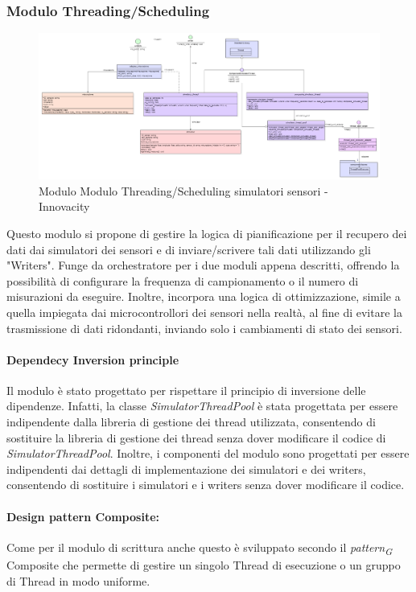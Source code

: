 \begin{itemize}
\subsubsection{Modulo Threading/Scheduling}
\begin{figure}[H]
    \centering
    \includegraphics[width=1.1\textwidth]{../Images/SpecificaTecnica/simulatorThread.PNG}
    \caption{Modulo Modulo Threading/Scheduling simulatori sensori - Innovacity}
    \label{fig: Modulo_simulatori_sensori_thread}
\end{figure}
Questo modulo si propone di gestire la logica di pianificazione per il recupero dei dati dai simulatori dei sensori e di inviare/scrivere tali dati utilizzando gli "Writers". Funge da orchestratore per i due moduli appena descritti, offrendo la possibilità di configurare la frequenza di campionamento o il numero di misurazioni da eseguire. Inoltre, incorpora una logica di ottimizzazione, simile a quella impiegata dai microcontrollori dei sensori nella realtà, al fine di evitare la trasmissione di dati ridondanti, inviando solo i cambiamenti di stato dei sensori.

\paragraph*{Dependecy Inversion principle}
Il modulo è stato progettato per rispettare il principio di inversione delle dipendenze. Infatti, la classe \textit{SimulatorThreadPool} è stata progettata per essere indipendente dalla libreria di gestione dei thread utilizzata, consentendo di sostituire la libreria di gestione dei thread senza dover modificare il codice di \textit{SimulatorThreadPool}.
Inoltre, i componenti del modulo sono progettati per essere indipendenti dai dettagli di implementazione dei simulatori e dei writers, consentendo di sostituire i simulatori e i writers senza dover modificare il codice.

\paragraph{Design pattern Composite:}
Come per il modulo di scrittura anche questo è sviluppato secondo il \textit{pattern}\textsubscript{\textit{G}} Composite che permette di gestire un singolo Thread di esecuzione o un gruppo di Thread in modo uniforme.

\end{itemize}
